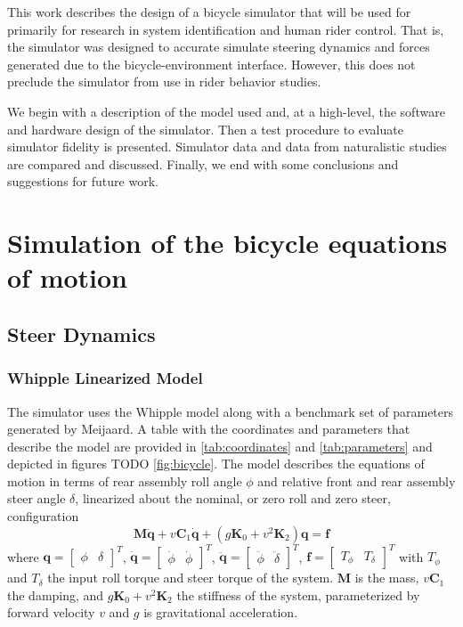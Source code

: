 \documentclass[11pt,a4paper,reqno]{amsart}
\newcommand{\mass}{\bm{M}}
\newcommand{\damping}{v \bm{C}_1}
\newcommand{\stiffness}{g \bm{K}_0 + v^2 \bm{K}_2}
\newcommand{\roll}{\phi}
\newcommand{\steer}{\delta}
\newcommand{\rollRate}{\dot{\phi}}
\newcommand{\steerRate}{\dot{\phi}}
\begin{document}
This work describes the design of a bicycle simulator that will be used for primarily for research in system
identification and human rider control.
That is, the simulator was designed to accurate simulate steering dynamics and forces generated due to the
bicycle-environment interface.
However, this does not preclude the simulator from use in rider behavior studies.

We begin with a description of the model used and, at a high-level, the software and hardware design of the simulator.
Then a test procedure to evaluate simulator fidelity is presented.
Simulator data and data from naturalistic studies are compared and discussed.
Finally, we end with some conclusions and suggestions for future work.

\section{Simulation of the bicycle equations of motion} \label{sec:sim_eom}
\subsection{Steer Dynamics} \label{sec:steer_dynamics}
\subsubsection{Whipple Linearized Model}

The simulator uses the Whipple model\cite{whipple1899} along with a benchmark set of parameters generated by
Meijaard\cite{meijaard2007}.
A table with the coordinates and parameters that describe the model are provided in
\autoref{tab:coordinates} and \autoref{tab:parameters} and depicted in figures TODO \autoref{fig:bicycle}.
The model describes the equations of motion in terms of rear assembly roll angle $\roll$ and relative front and rear
assembly steer angle $\steer$, linearized about the nominal, or zero roll and zero steer, configuration
\begin{equation}
    \mass \ddot{\bm{q}} + \damping \dot{\bm{q}} + (\stiffness) \bm{q} = \bm{f} \label{eq:eom}
\end{equation}
where
$ \bm{q} = \begin{bmatrix} \roll & \steer \end{bmatrix}^T $,
$ \dot{\bm{q}} = \begin{bmatrix} \rollRate & \steerRate \end{bmatrix}^T $,
$ \ddot{\bm{q}} = \begin{bmatrix} \ddot{\roll} & \ddot{\steer} \end{bmatrix}^T $,
$ \bm{f} = \begin{bmatrix} T_\roll & T_\steer \end{bmatrix}^T $ with $ T_\roll $ and $ T_\steer$ the input roll
torque and steer torque of the system.
$ \mass $ is the mass, $ \damping $ the damping, and $ \stiffness $ the stiffness of the system,
parameterized by forward velocity $ v $ and $ g $ is gravitational acceleration.
\end{document}
